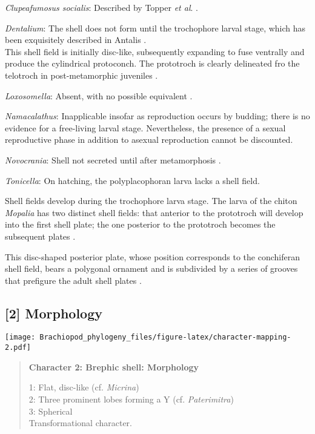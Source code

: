 \documentclass[openany]{book}
\theoremstyle{definition}
\theoremstyle{definition}
\theoremstyle{definition}
\theoremstyle{remark}
\begin{document}
\hypertarget{Clupeafumosus_socialis-coding-1}{}
\emph{Clupeafumosus socialis}: Described by Topper \emph{et al}.
\citeyearpar{Topper2013Reappraisalof}.

\hypertarget{Dentalium-coding-1}{}
\emph{Dentalium}: The shell does not form until the trochophore larval
stage, which has been exquisitely described in Antalis
\citep{Wanninger2001}.\\
This shell field is initially disc-like, subsequently expanding to fuse
ventrally and produce the cylindrical protoconch. The prototroch is
clearly delineated fro the telotroch in post-metamorphic juveniles
\citep{Wanninger2001}.

\hypertarget{Loxosomella-coding-1}{}
\emph{Loxosomella}: Absent, with no possible equivalent
\citep{Nielsen1966}.

\hypertarget{Namacalathus-coding-1}{}
\emph{Namacalathus}: Inapplicable insofar as reproduction occurs by
budding; there is no evidence for a free-living larval stage.
Nevertheless, the presence of a sexual reproductive phase in addition to
asexual reproduction cannot be discounted.

\hypertarget{Novocrania-coding-1}{}
\emph{Novocrania}: Shell not secreted until after metamorphosis
\citep{Popov2010Earliestontogeny}.

\hypertarget{Tonicella-coding-1}{}
\emph{Tonicella}: On hatching, the polyplacophoran larva lacks a shell
field.

Shell fields develop during the trochophore larva stage. The larva of
the chiton \emph{Mopalia} has two distinct shell fields: that anterior
to the prototroch will develop into the first shell plate; the one
posterior to the prototroch becomes the subsequent plates
\citep{Wanninger2002C}.

This disc-shaped posterior plate, whose position corresponds to the
conchiferan shell field, bears a polygonal ornament and is subdivided by
a series of grooves that prefigure the adult shell plates
\citep{Wanninger2002C}.

\subsection*{{[}2{]} Morphology}\label{morphology}

\texttt{[image: Brachiopod\_phylogeny\_files/figure-latex/character-mapping-2.pdf]}

\begin{quote}
\textbf{Character 2: Brephic shell: Morphology}

1: Flat, disc-like (cf. \emph{Micrina})\\
2: Three prominent lobes forming a Y (cf. \emph{Paterimitra})\\
3: Spherical\\
Transformational character.
\end{quote}
\end{document}
